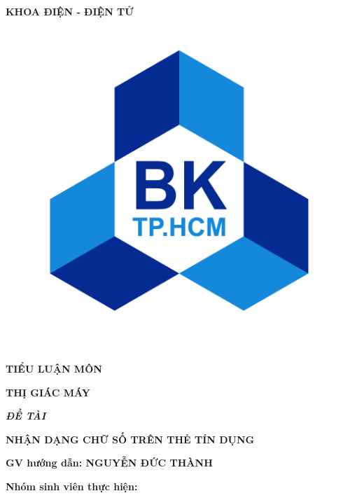 \begin{titlepage}
\begin{center}
        \vspace{7pt}
        \textbf{KHOA ĐIỆN - ĐIỆN TỬ}
    \end{center}
    \vspace{10pt}
    \begin{center}
        \includegraphics[scale=0.3]{images/Logo-BK.png}
        
        \vspace{10pt}
        \fontsize{18pt}{17pt}\selectfont 
        \textbf{TIỂU LUẬN MÔN} 
        
        \vspace{7pt}
        \textbf{THỊ GIÁC MÁY}
    \end{center}
    \begin{flushleft}
        \fontsize{14pt}{17pt}\selectfont  
        \textbf{\textsl{ĐỀ TÀI}}
    \end{flushleft}
    \begin{center}
        \fontsize{15pt}{17pt}\selectfont 
        \textbf{\textrm{NHẬN DẠNG CHỮ SỐ TRÊN THẺ TÍN DỤNG}}
    \end{center}
    
    \vspace{15pt}
    \hspace{1cm}
    \textbf{GV hướng dẫn: NGUYỄN ĐỨC THÀNH}
    
    \vspace{10pt}
    \hspace{1cm}
    \textbf{Nhóm sinh viên thực hiện:}
    

\end{titlepage}
